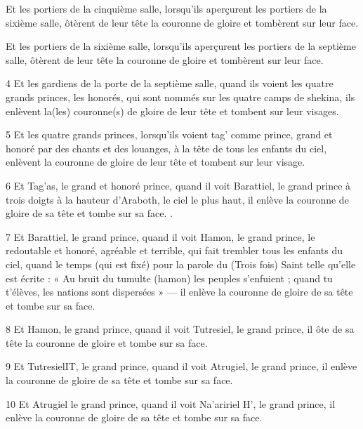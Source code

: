 \par Et les portiers de la cinquième salle, lorsqu'ils aperçurent les portiers de la sixième salle, ôtèrent de leur tête la couronne de gloire et tombèrent sur leur face.

\par Et les portiers de la sixième salle, lorsqu'ils aperçurent les portiers de la septième salle, ôtèrent de leur tête la couronne de gloire et tombèrent sur leur face.

\par 4 Et les gardiens de la porte de la septième salle, quand ils voient les quatre grands princes, les honorés, qui sont nommés sur les quatre camps de shekina, ils enlèvent la(les) couronne(s) de gloire de leur tête et tombent sur leur visages.

\par 5 Et les quatre grands princes, lorsqu'ils voient tag' comme prince, grand et honoré par des chants et des louanges, à la tête de tous les enfants du ciel, enlèvent la couronne de gloire de leur tête et tombent sur leur visage.

\par 6 Et Tag'as, le grand et honoré prince, quand il voit Barattiel, le grand prince à trois doigts à la hauteur d'Araboth, le ciel le plus haut, il enlève la couronne de gloire de sa tête et tombe sur sa face. .

\par 7 Et Barattiel, le grand prince, quand il voit Hamon, le grand prince, le redoutable et honoré, agréable et terrible, qui fait trembler tous les enfants du ciel, quand le temps (qui est fixé) pour la parole du (Trois fois) Saint telle qu'elle est écrite : « Au bruit du tumulte (hamon) les peuples s'enfuient ; quand tu t'élèves, les nations sont dispersées » — il enlève la couronne de gloire de sa tête et tombe sur sa face.

\par 8 Et Hamon, le grand prince, quand il voit Tutresiel, le grand prince, il ôte de sa tête la couronne de gloire et tombe sur sa face.

\par 9 Et TutresielIT, le grand prince, quand il voit Atrugiel, le grand prince, il enlève la couronne de gloire de sa tête et tombe sur sa face.

\par 10 Et Atrugiel le grand prince, quand il voit Na'aririel H', le grand prince, il enlève la couronne de gloire de sa tête et tombe sur sa face.

